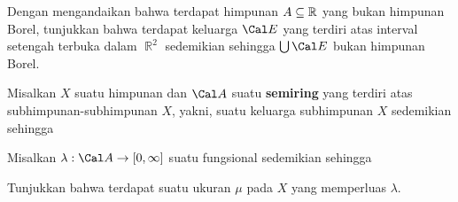 { Dengan mengandaikan bahwa terdapat himpunan
$A\subseteq\Bbb R$ yang bukan himpunan Borel, tunjukkan bahwa terdapat
keluarga $\Cal E$ yang terdiri atas interval setengah terbuka dalam
$\BbbR^2$ sedemikian sehingga $\bigcup\Cal E$ bukan himpunan Borel.

 Misalkan $X$ suatu himpunan dan $\Cal A$ suatu
{\bf semiring} yang terdiri atas subhimpunan-subhimpunan $X$, yakni,
suatu keluarga subhimpunan $X$ sedemikian sehingga




\noindent Misalkan $\lambda:\Cal A\to[0,\infty]$ suatu fungsional
sedemikian sehingga



\noindent Tunjukkan bahwa terdapat suatu ukuran $\mu$ pada $X$ yang
memperluas $\lambda$. 
}%

